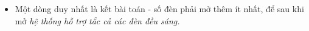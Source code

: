\begin{itemize}
	\item Một dòng duy nhất là kết bài toán - số đèn phải mở thêm ít nhất, để sau khi mở \emph{ hệ thống hỗ trợ }\emph{ tắc cả các đèn đều sáng. }
\end{itemize}